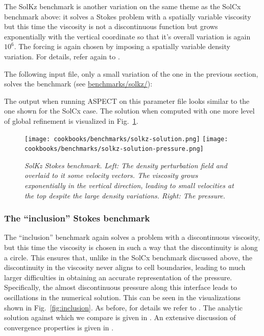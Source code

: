 \documentclass{article}
\newcommand{\aspect}{\textsc{ASPECT}}
\begin{document}
The SolKz benchmark is another variation on the same theme as the SolCx
benchmark above: it solves a Stokes problem with a spatially variable
viscosity but this time the viscosity is not a discontinuous function but
grows exponentially with the vertical coordinate so that it's overall
variation is again $10^6$. The forcing is again chosen by imposing a spatially
variable density variation. For details, refer again to \cite{DMGT11}.

The following input file, only a small variation of the one in the previous
section, solves the benchmark (see \url{benchmarks/solkz/}):



The output when running \aspect{} on this parameter file looks similar to the
one shown for the SolCx case. The solution when computed with one more level
of global refinement is visualized in Fig.~\ref{fig:solkz}.

\begin{figure}
  \begin{center}
    \texttt{[image: cookbooks/benchmarks/solkz-solution.png]}
    \hfill
    \texttt{[image: cookbooks/benchmarks/solkz-solution-pressure.png]}
    \caption{\it SolKz Stokes benchmark. Left: The density perturbation field
    and overlaid to it some velocity vectors. The viscosity grows exponentially
      in the vertical direction, leading to small velocities at the top
      despite the large density variations. Right: The
      pressure.}
    \label{fig:solkz}
  \end{center}
\end{figure}


\subsubsection{The ``inclusion'' Stokes benchmark}
\label{sec:benchmark-inclusion}

The ``inclusion'' benchmark again solves a problem with a discontinuous
viscosity, but this time the viscosity is chosen in such a way that the
discontinuity is along a circle. This ensures that, unlike in the SolCx
benchmark discussed above, the discontinuity in the viscosity never aligns to
cell boundaries, leading to much larger difficulties in obtaining an accurate
representation of the pressure. Specifically, the almost discontinuous
pressure along this interface leads to oscillations in the numerical
solution. This can be seen in the visualizations shown in
Fig.~\ref{fig:inclusion}. As before, for details we refer to
\cite{DMGT11}. The analytic solution against which we compare is given in
\cite{SP03}. An extensive discussion of convergence properties is given in
\cite{KHB12}.
\end{document}
